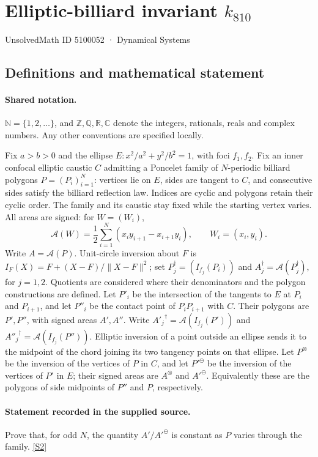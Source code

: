 \documentclass[11pt]{article}
\newcommand{\sref}[2]{\hyperlink{source:#1:#2}{[S#2]}}
\begin{document}
\setcounter{section}{5100051}
\section{Elliptic-billiard invariant $k_{810}$}\label{5100052}
{\small\sffamily UnsolvedMath ID 5100052 · Dynamical Systems}
\subsection{Definitions and mathematical statement}

\paragraph{Shared notation.}$\mathbb N=\{1,2,\ldots\}$, and $\mathbb Z,\mathbb Q,\mathbb R,\mathbb C$ denote the integers, rationals, reals and complex numbers. Any other conventions are specified locally.


Fix $a>b>0$ and the ellipse $E:x^2/a^2+y^2/b^2=1$, with foci $f_1,f_2$. Fix an inner confocal elliptic caustic $C$ admitting a Poncelet family of $N$-periodic billiard polygons $P=(P_i)_{i=1}^N$: vertices lie on $E$, sides are tangent to $C$, and consecutive sides satisfy the billiard reflection law. Indices are cyclic and polygons retain their cyclic order. The family and its caustic stay fixed while the starting vertex varies. All areas are signed: for $W=(W_i)$,
\[\mathcal A(W)=\frac12\sum_{i=1}^N(x_i y_{i+1}-x_{i+1}y_i),\qquad W_i=(x_i,y_i).\]
Write $A=\mathcal A(P)$. Unit-circle inversion about $F$ is $I_F(X)=F+(X-F)/\lVert X-F\rVert^2$; set $P_j^\dagger=(I_{f_j}(P_i))$ and $A_j^\dagger=\mathcal A(P_j^\dagger)$, for $j=1,2$. Quotients are considered where their denominators and the polygon constructions are defined. Let $P'_i$ be the intersection of the tangents to $E$ at $P_i$ and $P_{i+1}$, and let $P''_i$ be the contact point of $P_iP_{i+1}$ with $C$. Their polygons are $P',P''$, with signed areas $A',A''$. Write ${A'_j}^\dagger=\mathcal A(I_{f_j}(P'))$ and ${A''_j}^\dagger=\mathcal A(I_{f_j}(P''))$. Elliptic inversion of a point outside an ellipse sends it to the midpoint of the chord joining its two tangency points on that ellipse. Let $P^\otimes$ be the inversion of the vertices of $P$ in $C$, and let ${P'}^\ominus$ be the inversion of the vertices of $P'$ in $E$; their signed areas are $A^\otimes$ and ${A'}^\ominus$. Equivalently these are the polygons of side midpoints of $P''$ and $P$, respectively.
\paragraph{Statement recorded in the supplied source.}
Prove that, for odd $N$, the quantity $A'/{A'}^\ominus$ is constant as $P$ varies through the family. \sref{5100052}{2}
\end{document}
